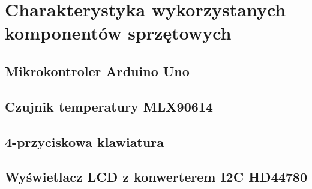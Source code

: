\chapter{Charakterystyka wykorzystanych komponentów sprzętowych}
    \section{Mikrokontroler Arduino Uno}
    \section{Czujnik temperatury MLX90614}
    \section{4-przyciskowa klawiatura}
    \section{Wyświetlacz LCD z konwerterem I2C HD44780}